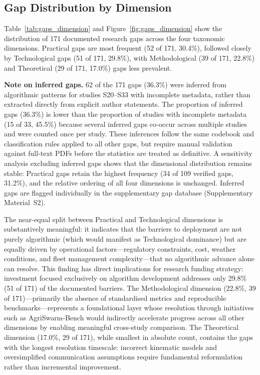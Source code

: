 \documentclass[review,3p,times]{elsarticle}
\begin{document}
\subsection{Gap Distribution by Dimension}

Table~\ref{tab:gaps_dimension} and Figure~\ref{fig:gaps_dimension} show the distribution of 171 documented research gaps across the four taxonomic dimensions. Practical gaps are most frequent (52 of 171, 30.4\%), followed closely by Technological gaps (51 of 171, 29.8\%), with Methodological (39 of 171, 22.8\%) and Theoretical (29 of 171, 17.0\%) gaps less prevalent.

\textbf{Note on inferred gaps.} 62 of the 171 gaps (36.3\%) were inferred from algorithmic patterns for studies S20--S33 with incomplete metadata, rather than extracted directly from explicit author statements. The proportion of inferred gaps (36.3\%) is lower than the proportion of studies with incomplete metadata (15 of 33, 45.5\%) because several inferred gaps co-occur across multiple studies and were counted once per study. These inferences follow the same codebook and classification rules applied to all other gaps, but require manual validation against full-text PDFs before the statistics are treated as definitive. A sensitivity analysis excluding inferred gaps shows that the dimensional distribution remains stable: Practical gaps retain the highest frequency (34 of 109 verified gaps, 31.2\%), and the relative ordering of all four dimensions is unchanged. Inferred gaps are flagged individually in the supplementary gap database (Supplementary Material~S2).

The near-equal split between Practical and Technological dimensions is substantively meaningful: it indicates that the barriers to deployment are not purely algorithmic (which would manifest as Technological dominance) but are equally driven by operational factors---regulatory constraints, cost, weather conditions, and fleet management complexity---that no algorithmic advance alone can resolve. This finding has direct implications for research funding strategy: investment focused exclusively on algorithm development addresses only 29.8\% (51 of 171) of the documented barriers. The Methodological dimension (22.8\%, 39 of 171)---primarily the absence of standardised metrics and reproducible benchmarks---represents a foundational layer whose resolution through initiatives such as AgriSwarm-Bench would indirectly accelerate progress across all other dimensions by enabling meaningful cross-study comparison. The Theoretical dimension (17.0\%, 29 of 171), while smallest in absolute count, contains the gaps with the longest resolution timescale: incorrect kinematic models and oversimplified communication assumptions require fundamental reformulation rather than incremental improvement.
\end{document}
